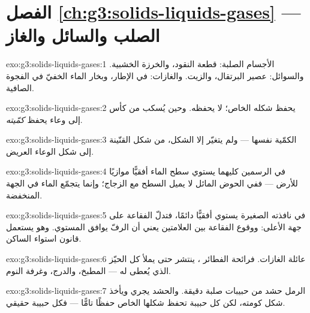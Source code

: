 \section*{الفصل \ref{ch:g3:solids-liquids-gases} --- الصلب والسائل والغاز}

\begin{solution}{exo:g3:solids-liquids-gases:1}
الأجسام الصلبة: قطعة النقود، والخرزة الخشبية. والسوائل: عصير
البرتقال، والزيت. والغازات:  في الإطار، وبخار الماء الخفيّ
في الفجوة الصافية.
\end{solution}

\begin{solution}{exo:g3:solids-liquids-gases:2}
 يحفظ شكله الخاص؛  لا يحفظه. وحين يُسكب من
كأس إلى وعاء يحفظ  \emph{كمّيته}.
\end{solution}

\begin{solution}{exo:g3:solids-liquids-gases:3}
الكمّية نفسها --- ولم يتغيّر إلا الشكل، من شكل القنّينة إلى شكل
الوعاء العريض.
\end{solution}

\begin{solution}{exo:g3:solids-liquids-gases:4}
في الرسمين كليهما يستوي سطح الماء أفقيًّا موازيًا للأرض ---
ففي الحوض المائل لا يميل السطح مع الزجاج؛ وإنما يتجمّع الماء في
الجهة المنخفضة.
\end{solution}

\begin{solution}{exo:g3:solids-liquids-gases:5}
 في نافذته الصغيرة يستوي أفقيًّا دائمًا، فتدلّ الفقاعة
على جهة الأعلى: ووقوع الفقاعة بين العلامتين يعني أن الرفّ يوافق
 المستوي. وهو يستعمل قانون استواء  الساكن.
\end{solution}

\begin{solution}{exo:g3:solids-liquids-gases:6}
عائلة الغازات. فرائحة الفطائر ،  ينتشر حتى يملأ كل
الحيّز الذي يُعطى له --- المطبخ، والدرج، وغرفة النوم.
\end{solution}

\begin{solution}{exo:g3:solids-liquids-gases:7}
الرمل حشد من حبيبات صلبة دقيقة. والحشد يجري ويأخذ شكل كومته،
لكن كل حبيبة تحفظ شكلها الخاص حفظًا تامًّا --- فكل حبيبة  حقيقي.
\end{solution}

